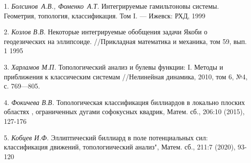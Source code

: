 \documentclass{vzmsthesis}
\begin{document}
\litlist

1. {\it Болсинов~А.В.,  Фоменко~А.Т. } Интегрируемые гамильтоновы системы.  Геометрия, топология, классификация.
Том I. --- Ижевск: РХД, 1999
\par 2. {\it  Козлов В.В. } Некоторые интегрируемые обобщения задачи Якоби о геодезических на эллипсоиде. //Прикладная математика и механика, том 59, вып. 1 1995
\par 3. {\it  Харламов М.П. } Топологический анализ и булевы функции: I. Методы и приближения к классическим системам //Нелинейная динамика, 2010, том 6, №4, с. 769---805.
\par 4. {\it  Фокичева В.В.  } Топологическая классификация биллиардов в локально плоских областях , ограниченных дугами софокусных квадрик, Матем. сб., 206:10 (2015), 127-176
\par 5. {\it Кобцев И.Ф.  } Эллиптический биллиард в поле потенциальных сил: классификация движений, топологиический анализ", Матем. сб., 211:7 (2020), 93-120
\end{document}
